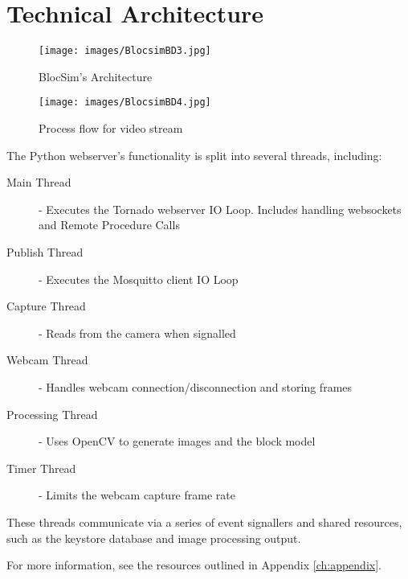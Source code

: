 \clearpage





\section{Technical Architecture}

\begin{figure}[ht!]
\centering
\texttt{[image: images/BlocsimBD3.jpg]}
\caption{BlocSim's Architecture}
\label{im:BlocsimBD3}
\end{figure}

\begin{figure}[ht!]
\centering
\texttt{[image: images/BlocsimBD4.jpg]}
\caption{Process flow for video stream}
\label{im:BlocsimBD4}
\end{figure}


\clearpage

\noindent The Python webserver's functionality is split into several threads, including:

\begin{description}
	\item[Main Thread] - Executes the Tornado webserver IO Loop. Includes handling websockets and Remote Procedure Calls
	\item[Publish Thread] - Executes the Mosquitto client IO Loop
	\item[Capture Thread] - Reads from the camera when signalled
	\item[Webcam Thread] - Handles webcam connection/disconnection and storing frames
	\item[Processing Thread] - Uses OpenCV to generate images and the block model
	\item[Timer Thread] - Limits the webcam capture frame rate
\end{description}

\noindent These threads communicate via a series of event signallers and shared resources, such as the keystore database and image processing output.



\vspace{1 cm}

\noindent For more information, see the resources outlined in Appendix \ref{ch:appendix}.




